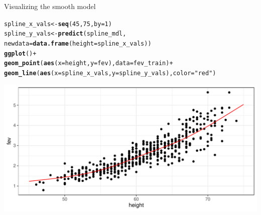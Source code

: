 \documentclass[table]{beamer}\usepackage[]{graphicx}\usepackage[]{color}
\makeatletter
\def\maxwidth{ %
  \ifdim\Gin@nat@width>\linewidth
    \linewidth
  \else
    \Gin@nat@width
  \fi
}
\newcommand{\hlnum}[1]{\textcolor[rgb]{0.686,0.059,0.569}{#1}}%
\newcommand{\hlstr}[1]{\textcolor[rgb]{0.192,0.494,0.8}{#1}}%
\newcommand{\hlopt}[1]{\textcolor[rgb]{0,0,0}{#1}}%
\newcommand{\hlstd}[1]{\textcolor[rgb]{0.345,0.345,0.345}{#1}}%
\newcommand{\hlkwb}[1]{\textcolor[rgb]{0.69,0.353,0.396}{#1}}%
\newcommand{\hlkwc}[1]{\textcolor[rgb]{0.333,0.667,0.333}{#1}}%
\newcommand{\hlkwd}[1]{\textcolor[rgb]{0.737,0.353,0.396}{\textbf{#1}}}%
\newenvironment{kframe}{%
 \def\at@end@of@kframe{}%
 \ifinner\ifhmode%
  \def\at@end@of@kframe{\end{minipage}}%
  \begin{minipage}{\columnwidth}%
 \fi\fi%
 \def\FrameCommand##1{\hskip\@totalleftmargin \hskip-\fboxsep
 \colorbox{shadecolor}{##1}\hskip-\fboxsep
     \hskip-\linewidth \hskip-\@totalleftmargin \hskip\columnwidth}%
 \MakeFramed {\advance\hsize-\width
   \@totalleftmargin\z@ \linewidth\hsize
   \@setminipage}}%
 {\par\unskip\endMakeFramed%
 \at@end@of@kframe}
\newenvironment{knitrout}{}{} %
\makeatother
\begin{document}
\begin{frame}[fragile]{Visualizing the smooth model}


\scriptsize
\begin{knitrout}\footnotesize
{}\color{fgcolor}\begin{kframe}
\begin{alltt}
\hlstd{spline_x_vals} \hlkwb{<-} \hlkwd{seq}\hlstd{(}\hlnum{45}\hlstd{,} \hlnum{75}\hlstd{,} \hlkwc{by}\hlstd{=}\hlnum{1}\hlstd{)}
\hlstd{spline_y_vals} \hlkwb{<-} \hlkwd{predict}\hlstd{(spline_mdl,}
  \hlkwc{newdata} \hlstd{=} \hlkwd{data.frame}\hlstd{(}\hlkwc{height}\hlstd{=spline_x_vals))}
\hlkwd{ggplot}\hlstd{()} \hlopt{+}
  \hlkwd{geom_point}\hlstd{(}\hlkwd{aes}\hlstd{(}\hlkwc{x}\hlstd{=height,} \hlkwc{y}\hlstd{=fev),} \hlkwc{data}\hlstd{=fev_train)} \hlopt{+}
  \hlkwd{geom_line}\hlstd{(}\hlkwd{aes}\hlstd{(}\hlkwc{x} \hlstd{= spline_x_vals,} \hlkwc{y}\hlstd{=spline_y_vals),} \hlkwc{color}\hlstd{=}\hlstr{"red"}\hlstd{)}
\end{alltt}
\end{kframe}

{\centering \includegraphics[width=\maxwidth]{figs/beamer-unnamed-chunk-4-1} 

}



\end{knitrout}

\end{frame}


\end{document}
